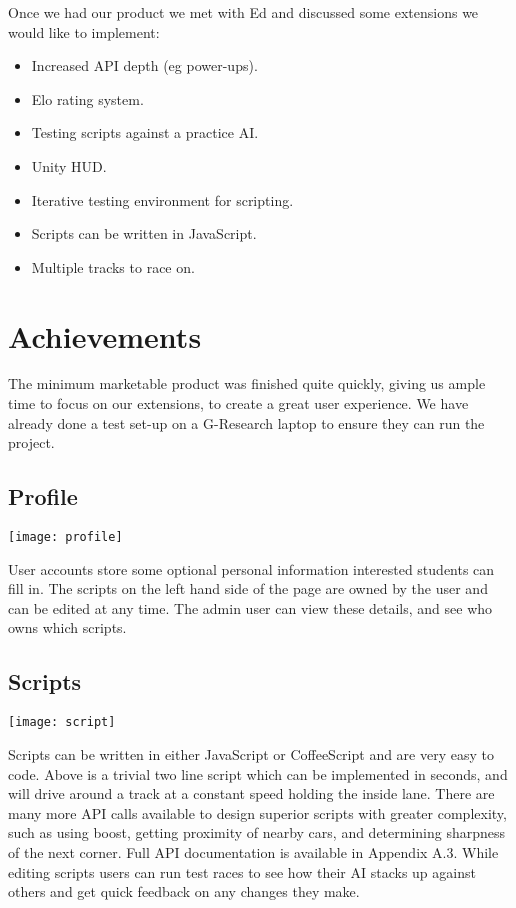 Once we had our product we met with Ed and discussed some extensions we would like to implement:

\begin{itemize}
	\item Increased API depth (eg power-ups).
	\item Elo rating system.
	\item Testing scripts against a practice AI.
	\item Unity HUD.
	\item Iterative testing environment for scripting.
	\item Scripts can be written in JavaScript.
	\item Multiple tracks to race on.
\end{itemize}

\section{Achievements}

The minimum marketable product was finished quite quickly, giving us ample time to focus on our extensions, to create a great user experience. We have already done a test set-up on a G-Research laptop to ensure they can run the project.

\subsection{Profile}
\centerline{\texttt{[image: profile]}}
User accounts store some optional personal information interested students can fill in. The scripts on the left hand side of the page are owned by the user and can be edited at any time. The admin user can view these details, and see who owns which scripts.

\subsection{Scripts}
\centerline{\texttt{[image: script]}}
Scripts can be written in either JavaScript or CoffeeScript and are very easy to code. Above is a trivial two line script which can be implemented in seconds, and will drive around a track at a constant speed holding the inside lane. There are many more API calls available to design superior scripts with greater complexity, such as using boost, getting proximity of nearby cars, and determining sharpness of the next corner. Full API documentation is available in Appendix A.3. While editing scripts users can run test races to see how their AI stacks up against others and get quick feedback on any changes they make.

